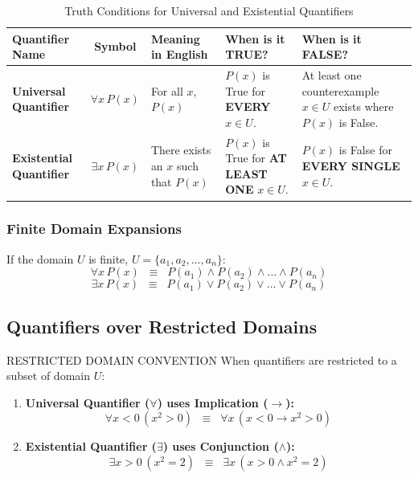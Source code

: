 \documentclass[11pt,a4paper]{article}
\begin{document}
\begin{table}[htbp]
\centering
\small
\begin{tabularx}{\textwidth}{|l|c|l|X|X|}
\hline
\rowcolor{primaryblue} \color{white}\textbf{Quantifier Name} & \color{white}\textbf{Symbol} & \color{white}\textbf{Meaning in English} & \color{white}\textbf{When is it TRUE?} & \color{white}\textbf{When is it FALSE?} \\ \hline
\textbf{Universal Quantifier} & $\forall x \, P(x)$ & For all $x$, $P(x)$ & $P(x)$ is True for \textbf{EVERY} $x \in U$. & At least one counterexample $x \in U$ exists where $P(x)$ is False. \\ \hline
\textbf{Existential Quantifier} & $\exists x \, P(x)$ & There exists an $x$ such that $P(x)$ & $P(x)$ is True for \textbf{AT LEAST ONE} $x \in U$. & $P(x)$ is False for \textbf{EVERY SINGLE} $x \in U$. \\ \hline
\end{tabularx}
\caption{Truth Conditions for Universal and Existential Quantifiers}
\end{table}

\subsubsection*{Finite Domain Expansions}
If the domain $U$ is finite, $U = \{a_1, a_2, \dots, a_n\}$:
$$\forall x \, P(x) \;\;\equiv\;\; P(a_1) \land P(a_2) \land \dots \land P(a_n)$$
$$\exists x \, P(x) \;\;\equiv\;\; P(a_1) \lor P(a_2) \lor \dots \lor P(a_n)$$

\subsection{Quantifiers over Restricted Domains}

\begin{examtip}{RESTRICTED DOMAIN CONVENTION}
When quantifiers are restricted to a subset of domain $U$:
\begin{enumerate}[leftmargin=1.5em]
    \item \textbf{Universal Quantifier ($\forall$) uses Implication ($\rightarrow$):}
    $$\forall x < 0 \, (x^2 > 0) \;\;\equiv\;\; \forall x \, (x < 0 \rightarrow x^2 > 0)$$
    \item \textbf{Existential Quantifier ($\exists$) uses Conjunction ($\land$):}
    $$\exists x > 0 \, (x^2 = 2) \;\;\equiv\;\; \exists x \, (x > 0 \land x^2 = 2)$$
\end{enumerate}
\end{examtip}
\end{document}
